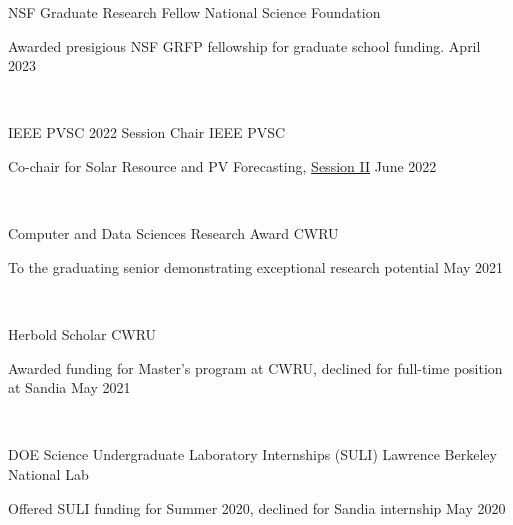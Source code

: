 \documentclass[10pt]{article}
\begin{document}
 {

{ 
	NSF Graduate Research Fellow} 
\hspace*{0pt}\hfill National Science Foundation

Awarded presigious NSF GRFP fellowship for graduate school funding. \hspace*{0pt}\hfill April 2023

\
	
	

{ 
	IEEE PVSC 2022 Session Chair} 
\hspace*{0pt}\hfill IEEE PVSC 

Co-chair for Solar Resource and PV Forecasting,  \href{https://ieee-pvsc.org/PVSC49/program-full.php?page=program&displayday=6&pads=&start_range=&start_interval=&changing_days=yes&hide_details=}{Session II} \hspace*{0pt}\hfill June 2022

\




%
%
{ 
Computer and Data Sciences Research Award} 
\hspace*{0pt}\hfill CWRU 

To the graduating senior demonstrating exceptional research potential \hspace*{0pt}\hfill May 2021

\

{ 
Herbold Scholar} 
\hspace*{0pt}\hfill CWRU 

Awarded funding for Master's program at CWRU, declined for full-time position at Sandia \hspace*{0pt}\hfill May 2021

\

{ 
	DOE Science Undergraduate Laboratory Internships (SULI)} 
\hspace*{0pt}\hfill Lawrence Berkeley National Lab

Offered SULI funding for Summer 2020, declined for Sandia internship \hspace*{0pt}\hfill May 2020

}
\end{document}
